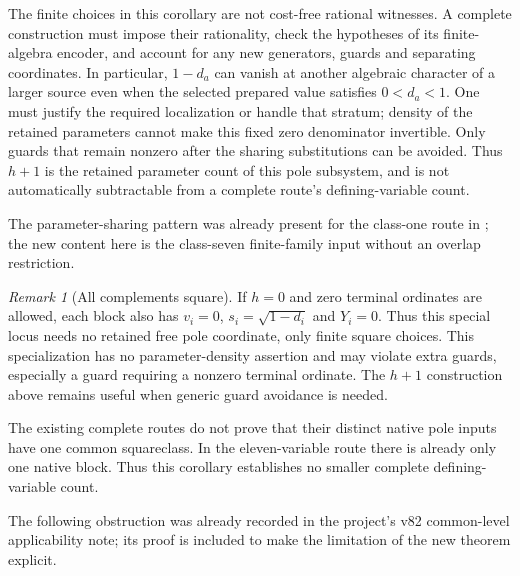 \documentclass[11pt,a4paper]{article}
\theoremstyle{remark}\newtheorem{remark}[theorem]{Remark}
\begin{document}
The finite choices in this corollary are not cost-free rational
witnesses. A complete construction must impose their rationality,
check the hypotheses of its finite-algebra encoder, and account for
any new generators, guards and separating coordinates. In particular,
$1-d_a$ can vanish at another algebraic character of a larger source
even when the selected prepared value satisfies $0<d_a<1$.
One must justify the required localization or handle that stratum;
density of the retained parameters cannot make this fixed zero
denominator invertible. Only guards that remain nonzero after the
sharing substitutions can be avoided. Thus $h+1$ is the retained
parameter count of this pole subsystem, and is not automatically
subtractable from a complete route's defining-variable count.

The parameter-sharing pattern was already present for the class-one
route in \cite{Common}; the new content here is the class-seven
finite-family input without an overlap restriction.

\begin{remark}[All complements square]
If $h=0$ and zero terminal ordinates are allowed, each block also has
$v_i=0$, $s_i=\sqrt{1-d_i}$ and $Y_i=0$. Thus this special locus
needs no retained free pole coordinate, only finite square choices.
This specialization has no parameter-density assertion and may violate
extra guards, especially a guard requiring a nonzero terminal ordinate.
The $h+1$ construction above remains useful when generic guard avoidance
is needed.
\end{remark}

The existing complete routes do not prove that their distinct native
pole inputs have one common squareclass. In the eleven-variable route
there is already only one native block. Thus this corollary establishes
no smaller complete defining-variable count.

The following obstruction was already recorded in the project's v82
common-level applicability note; its proof is included to make the
limitation of the new theorem explicit.
\end{document}
